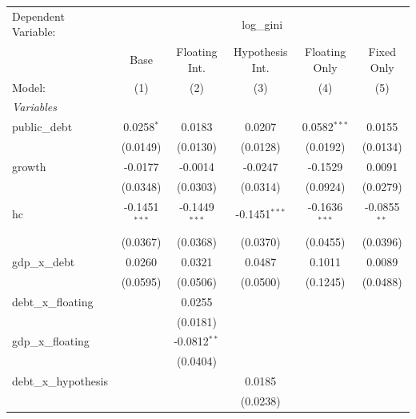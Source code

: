 
\begingroup
\centering
\begin{tabular}{lccccc}
   \tabularnewline \midrule \midrule
   Dependent Variable: & \multicolumn{5}{c}{log\_gini}\\
                         & Base            & Floating Int.   & Hypothesis Int. & Floating Only   & Fixed Only \\   
   Model:                & (1)             & (2)             & (3)             & (4)             & (5)\\  
   \midrule
   \emph{Variables}\\
   public\_debt          & 0.0258$^{*}$    & 0.0183          & 0.0207          & 0.0582$^{***}$  & 0.0155\\   
                         & (0.0149)        & (0.0130)        & (0.0128)        & (0.0192)        & (0.0134)\\   
   growth                & -0.0177         & -0.0014         & -0.0247         & -0.1529         & 0.0091\\   
                         & (0.0348)        & (0.0303)        & (0.0314)        & (0.0924)        & (0.0279)\\   
   hc                    & -0.1451$^{***}$ & -0.1449$^{***}$ & -0.1451$^{***}$ & -0.1636$^{***}$ & -0.0855$^{**}$\\   
                         & (0.0367)        & (0.0368)        & (0.0370)        & (0.0455)        & (0.0396)\\   
   gdp\_x\_debt          & 0.0260          & 0.0321          & 0.0487          & 0.1011          & 0.0089\\   
                         & (0.0595)        & (0.0506)        & (0.0500)        & (0.1245)        & (0.0488)\\   
   debt\_x\_floating     &                 & 0.0255          &                 &                 &   \\   
                         &                 & (0.0181)        &                 &                 &   \\   
   gdp\_x\_floating      &                 & -0.0812$^{**}$  &                 &                 &   \\   
                         &                 & (0.0404)        &                 &                 &   \\   
   debt\_x\_hypothesis   &                 &                 & 0.0185          &                 &   \\   
                         &                 &                 & (0.0238)        &                 &   \\   

\end{tabular}

